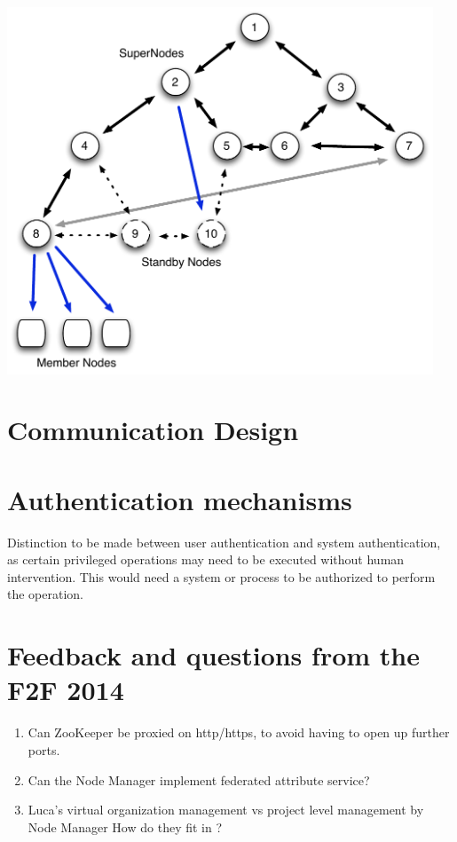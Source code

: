 \documentclass[oneside,12pt]{memoir}
\def\nm{Node Manager{ }}
\begin{document}
\begin{center}
\includegraphics[width=5in]{presentation/Node-comm-v2.pdf}
\end{center}

\section{Communication Design}




\section{Authentication mechanisms}
Distinction to be made between user authentication and system authentication, as certain privileged operations may need to be executed without human intervention. This would need a system or process to be authorized to perform the operation. 

\section{Feedback and questions from the F2F 2014}
\begin{enumerate}
\item Can ZooKeeper be proxied on http/https, to avoid having to open up further ports.
\item Can the \nm implement federated attribute service?
\item Luca's virtual organization management vs project level management by \nm How do they fit in ?
\end{enumerate}
\end{document}
